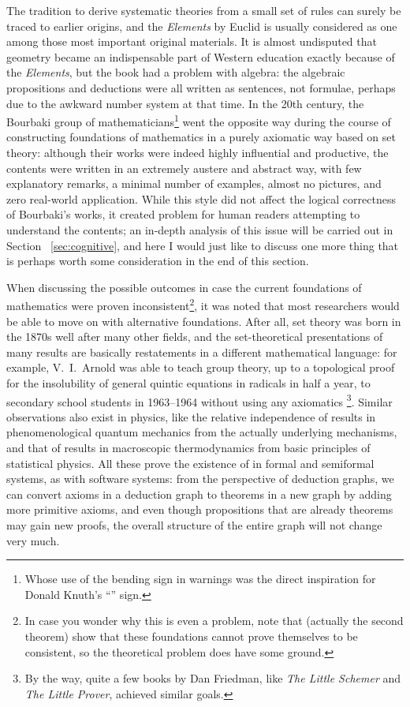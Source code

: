 The tradition to derive systematic theories from a small set of rules can surely
be traced to earlier origins, and the \emph{Elements} by Euclid is usually
considered as one among those most important original materials.  It is almost
undisputed that geometry became an indispensable part of Western education
exactly because of the \emph{Elements}, but the book had a problem with algebra:
the algebraic propositions and deductions were all written as sentences, not
formulae, perhaps due to the awkward number system at that time.  In the 20th
century, the Bourbaki group of mathematicians\footnote{Whose use of the bending
sign in warnings was the direct inspiration for Donald Knuth's ``\textdbend''
sign.} went the opposite way during the course of constructing foundations
of mathematics in a purely axiomatic way based on set theory: although their
works were indeed highly influential and productive, the contents were written
in an extremely austere and abstract way, with few explanatory remarks, a
minimal number of examples, almost no pictures, and zero real-world application.
While this style did not affect the logical correctness of Bourbaki's works,
it created problem for human readers attempting to understand the contents;
an in-depth analysis of this issue will be carried out in Section~%
\ref{sec:cognitive}, and here I would just like to discuss one more thing
that is perhaps worth some consideration in the end of this section.

When discussing the possible outcomes in case the current foundations of
mathematics were proven inconsistent\footnote{In case
you wonder why this is even a problem, note that  (actually the second theorem) show that these
foundations cannot prove themselves to be consistent, so the theoretical problem
does have some ground.}, it was noted that most researchers would be able to
move on with alternative foundations.  After all, set theory was born in the
1870s well after many other fields, and the set-theoretical presentations of
many results are basically restatements in a different mathematical language:
for example, V.~I.\ Arnold was able to teach group theory, up to a topological
proof for the insolubility of general quintic equations in radicals in half a
year, to secondary school students in 1963--1964 without using any axiomatics%
\footnote{By the way, quite a few books
by Dan Friedman, like \emph{The Little Schemer} and \emph{The Little Prover},
achieved similar goals.}.  Similar observations also exist in physics, like
the relative independence of results in phenomenological quantum mechanics
from the actually underlying mechanisms, and that of results in macroscopic
thermodynamics from basic principles of statistical physics.  All these
prove the existence of 
in formal and semiformal systems, as with software systems: from the
perspective of deduction graphs, we can convert axioms in a deduction
graph to theorems in a new graph by adding more primitive axioms, and
even though propositions that are already theorems may gain new proofs,
the overall structure of the entire graph will not change very much.

